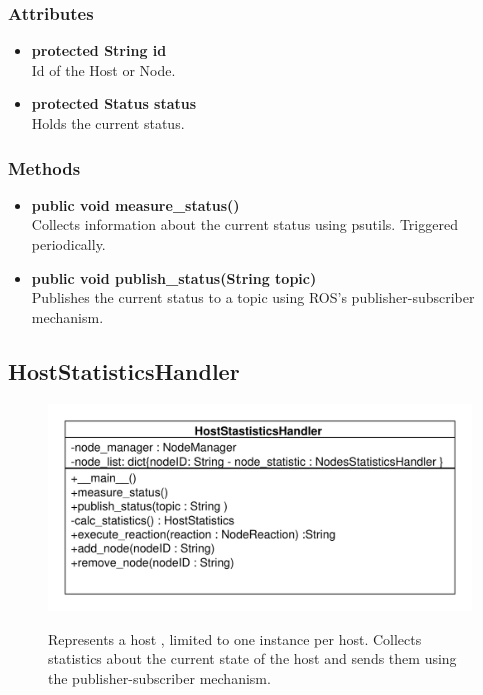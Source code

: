 \subsubsection{Attributes}
\begin{itemize}
	\item \textbf{protected String id}\\
	Id of the Host or Node.	
	\item \textbf{protected Status status}\\
	Holds the current status.
\end{itemize}

\subsubsection{Methods}
\begin{itemize}
\item \textbf{public void measure\_status()}\\
			Collects information about the current status using psutils.
			Triggered periodically.
\item \textbf{public void publish\_status(String topic)}\\
			Publishes the current status to a topic using ROS's publisher-subscriber mechanism.
\end{itemize}



\subsection{HostStatisticsHandler}
\begin{figure}[htbp]
	\begin{minipage}[t]{7cm}
		\vspace{0pt}
		\centering
		\includegraphics[scale=0.6]{./diagram_pictures/NodeInterface/HostStatisticsHandler.pdf}
	\end{minipage}
	\hfill
	\begin{minipage}[t]{5cm}
		\vspace{10pt}
		Represents a host , limited to one instance per host. Collects statistics about the current state of the host and sends them using the 				publisher-subscriber mechanism.
	\end{minipage}
\end{figure}


